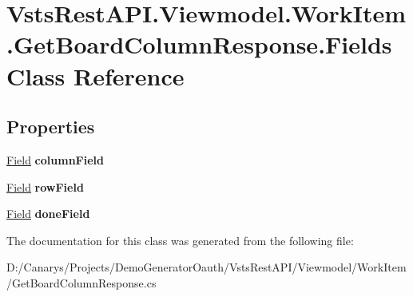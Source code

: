 \hypertarget{class_vsts_rest_a_p_i_1_1_viewmodel_1_1_work_item_1_1_get_board_column_response_1_1_fields}{}\section{Vsts\+Rest\+A\+P\+I.\+Viewmodel.\+Work\+Item.\+Get\+Board\+Column\+Response.\+Fields Class Reference}
\label{class_vsts_rest_a_p_i_1_1_viewmodel_1_1_work_item_1_1_get_board_column_response_1_1_fields}
\subsection*{Properties}
\begin{DoxyCompactItemize}
\item 
\mbox{\label{class_vsts_rest_a_p_i_1_1_viewmodel_1_1_work_item_1_1_get_board_column_response_1_1_fields_af6e72a1a12b00cd6c88947edad665778}} 
\mbox{\hyperlink{class_vsts_rest_a_p_i_1_1_viewmodel_1_1_work_item_1_1_get_board_column_response_1_1_field}{Field}} {\bfseries column\+Field}
\item 
\mbox{\label{class_vsts_rest_a_p_i_1_1_viewmodel_1_1_work_item_1_1_get_board_column_response_1_1_fields_ad05ee1cb6a18b64b86871a73205985d6}} 
\mbox{\hyperlink{class_vsts_rest_a_p_i_1_1_viewmodel_1_1_work_item_1_1_get_board_column_response_1_1_field}{Field}} {\bfseries row\+Field}
\item 
\mbox{\label{class_vsts_rest_a_p_i_1_1_viewmodel_1_1_work_item_1_1_get_board_column_response_1_1_fields_ab9ddcd96dbe4eadb5b0d06d9ffa9a665}} 
\mbox{\hyperlink{class_vsts_rest_a_p_i_1_1_viewmodel_1_1_work_item_1_1_get_board_column_response_1_1_field}{Field}} {\bfseries done\+Field}
\end{DoxyCompactItemize}


The documentation for this class was generated from the following file\+:\begin{DoxyCompactItemize}
\item 
D\+:/\+Canarys/\+Projects/\+Demo\+Generator\+Oauth/\+Vsts\+Rest\+A\+P\+I/\+Viewmodel/\+Work\+Item/Get\+Board\+Column\+Response.\+cs\end{DoxyCompactItemize}
